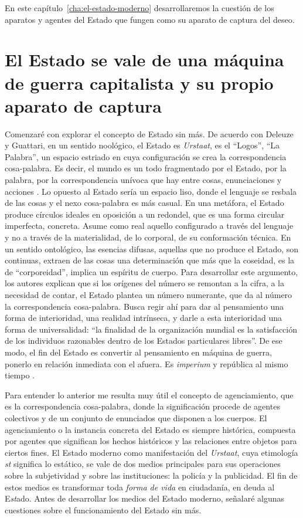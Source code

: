 En este capítulo~\ref{cha:el-estado-moderno} desarrollaremos la cuestión de los aparatos y agentes del Estado que fungen como su aparato de captura del deseo.

\section{El Estado se vale de una máquina de guerra capitalista y su propio aparato de captura}
\label{sec:el-estado-se-vale-de}

Comenzaré con explorar el concepto de Estado sin más. De acuerdo con Deleuze y Guattari, en un sentido noológico, el Estado es \emph{Urstaat}, es el \enquote{Logos}, \enquote{La Palabra}, un espacio estriado en cuya configuración se crea la correspondencia cosa-palabra. Es decir, el mundo es un todo fragmentado por el Estado, por la palabra, por la correspondencia unívoca que hay entre cosas, enunciaciones y acciones \autocite{deleuzeMilMesetasCapitalismo2002}. Lo opuesto al Estado sería un espacio liso, donde el lenguaje se resbala de las cosas y el nexo cosa-palabra es más casual. En una metáfora, el Estado produce círculos ideales en oposición a un redondel, que es una forma circular imperfecta, concreta. Asume como real aquello configurado a través del lenguaje y no a través de la materialidad, de lo corporal, de su conformación técnica. En un sentido ontológico, las esencias difusas, aquellas que no produce el Estado, son continuas, extraen de las cosas una determinación que más que la coseidad, es la de \enquote{corporeidad}, implica un espíritu de cuerpo. Para desarrollar este argumento, los autores explican que si los orígenes del número se remontan a la cifra, a la necesidad de contar, el Estado plantea un número numerante, que da al número la correspondencia cosa-palabra. Busca regir ahí para dar al pensamiento una forma de interioridad, una realidad intrínseca, y darle a esta interioridad una forma de universalidad: \enquote{la finalidad de la organización mundial es la satisfacción de los individuos razonables dentro de los Estados particulares libres}. De ese modo, el fin del Estado es convertir al pensamiento en máquina de guerra, ponerlo en relación inmediata con el afuera. Es \emph{imperium} y república al mismo tiempo \autocite[pp.~380, 381, 397]{deleuzeMilMesetasCapitalismo2002}.

Para entender lo anterior me resulta muy útil el concepto de agenciamiento, que es la correspondencia cosa-palabra, donde la significación procede de agentes colectivos y de un conjunto de enunciados que disponen a los cuerpos. El agenciamiento o la instancia concreta del Estado es siempre histórica, compuesta por agentes que significan los hechos históricos y las relaciones entre objetos para ciertos fines. El Estado moderno como manifestación del \emph{Urstaat}, cuya etimología \emph{st} significa lo estático, se vale de dos medios principales para sus operaciones sobre la subjetividad y sobre las instituciones: la policía y la publicidad. El fin de estos medios es transformar toda \emph{forma de vida} en ciudadanía, en deuda al E\emph{st}ado. Antes de desarrollar los medios del Estado moderno, señalaré algunas cuestiones sobre el funcionamiento del Estado sin más.

